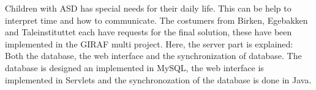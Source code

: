 Children with ASD has special needs for their daily life. This can be help to interpret time and how to communicate.
The costumers from Birken, Egebakken and Taleinstituttet each have requests for the final solution, these have been implemented in the GIRAF multi project. Here, the server part is explained: Both the database, the web interface and the synchronization of database. The database is designed an implemented in MySQL, the web interface is implemented in Servlets and the synchronozation of the database is done in Java.
